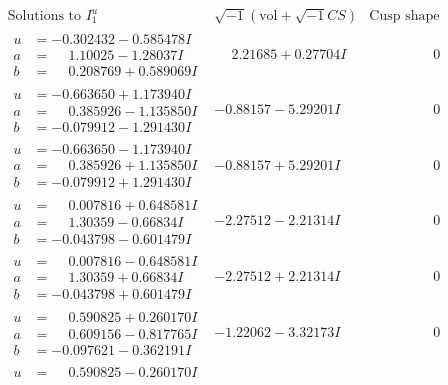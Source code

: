 \documentclass[1p]{elsarticle_modified}
\theoremstyle{definition}
\newcommand{\I}{\sqrt{-1}}
\begin{document}
$$\begin{array}{c|c|c}
\text{Solutions to }I^u_{1}& \I (\text{vol} + \sqrt{-1}CS) & \text{Cusp shape}\\
 \hline 
\begin{aligned}
u &= -0.302432 - 0.585478 I \\
a &= \phantom{-}1.10025 - 1.28037 I \\
b &= \phantom{-}0.208769 + 0.589069 I\end{aligned}
 & \phantom{-}2.21685 + 0.27704 I & \phantom{-0.000000 } 0 \\ \hline\begin{aligned}
u &= -0.663650 + 1.173940 I \\
a &= \phantom{-}0.385926 - 1.135850 I \\
b &= -0.079912 - 1.291430 I\end{aligned}
 & -0.88157 - 5.29201 I & \phantom{-0.000000 } 0 \\ \hline\begin{aligned}
u &= -0.663650 - 1.173940 I \\
a &= \phantom{-}0.385926 + 1.135850 I \\
b &= -0.079912 + 1.291430 I\end{aligned}
 & -0.88157 + 5.29201 I & \phantom{-0.000000 } 0 \\ \hline\begin{aligned}
u &= \phantom{-}0.007816 + 0.648581 I \\
a &= \phantom{-}1.30359 - 0.66834 I \\
b &= -0.043798 - 0.601479 I\end{aligned}
 & -2.27512 - 2.21314 I & \phantom{-0.000000 } 0 \\ \hline\begin{aligned}
u &= \phantom{-}0.007816 - 0.648581 I \\
a &= \phantom{-}1.30359 + 0.66834 I \\
b &= -0.043798 + 0.601479 I\end{aligned}
 & -2.27512 + 2.21314 I & \phantom{-0.000000 } 0 \\ \hline\begin{aligned}
u &= \phantom{-}0.590825 + 0.260170 I \\
a &= \phantom{-}0.609156 - 0.817765 I \\
b &= -0.097621 - 0.362191 I\end{aligned}
 & -1.22062 - 3.32173 I & \phantom{-0.000000 } 0 \\ \hline\begin{aligned}
u &= \phantom{-}0.590825 - 0.260170 I \\

\end{aligned}
\end{array}$$
\end{document}
